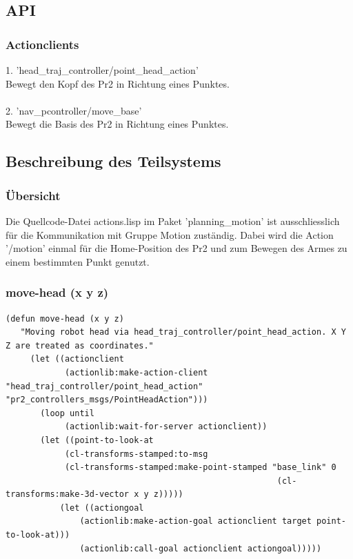 \documentclass{suturo}
\begin{document}
\subsection{API}
\subsubsection{Actionclients}
1. 'head\_traj\_controller/point\_head\_action' \\
Bewegt den Kopf des Pr2 in Richtung eines Punktes.\\ \\
2. 'nav\_pcontroller/move\_base' \\
Bewegt die Basis des Pr2 in Richtung eines Punktes.
\subsection{Beschreibung des Teilsystems}

\subsubsection{\"Ubersicht}
Die Quellcode-Datei actions.lisp im Paket 'planning\_motion'  ist ausschliesslich für die Kommunikation mit Gruppe Motion zuständig. Dabei wird die Action '/motion' einmal für die Home-Position des Pr2 und zum Bewegen des Armes zu einem bestimmten Punkt genutzt.



\subsubsection{move-head (x y z)}

\noindent
\begin{minipage}{\linewidth}
\begin{lstlisting}
(defun move-head (x y z)
   "Moving robot head via head_traj_controller/point_head_action. X Y Z are treated as coordinates."
     (let ((actionclient 
            (actionlib:make-action-client "head_traj_controller/point_head_action" "pr2_controllers_msgs/PointHeadAction")))
       (loop until
            (actionlib:wait-for-server actionclient))
       (let ((point-to-look-at 
            (cl-transforms-stamped:to-msg 
            (cl-transforms-stamped:make-point-stamped "base_link" 0 
                                                       (cl-transforms:make-3d-vector x y z)))))
           (let ((actiongoal 
               (actionlib:make-action-goal actionclient target point-to-look-at)))
               (actionlib:call-goal actionclient actiongoal)))))
\end{lstlisting}
\end{minipage}
\end{document}
